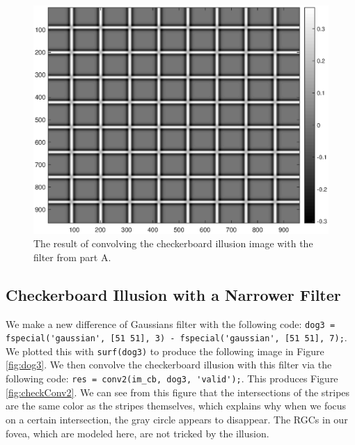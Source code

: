 \documentclass[11pt, oneside]{article}
\begin{document}
\begin{figure}[ht!]
\includegraphics[width=1\textwidth]{check_dog_conv.eps}
\caption{The result of convolving the checkerboard illusion image with the filter from part A.}
\label{fig:checkConv}
\end{figure}

\subsection{Checkerboard Illusion with a Narrower Filter}

We make a new difference of Gaussians filter with the following code: \lstinline{dog3 = fspecial('gaussian', [51 51], 3) - fspecial('gaussian', [51 51], 7);}. We plotted this with \lstinline{surf(dog3)} to produce the following image in Figure \ref{fig:dog3}. We then convolve the checkerboard illusion with this filter via the following code: \lstinline{res = conv2(im_cb, dog3, 'valid');}. This produces Figure \ref{fig:checkConv2}. We can see from this figure that the intersections of the stripes are the same color as the stripes themselves, which explains why when we focus on a certain intersection, the gray circle appears to disappear. The RGCs in our fovea, which are modeled here, are not tricked by the illusion.
\end{document}
